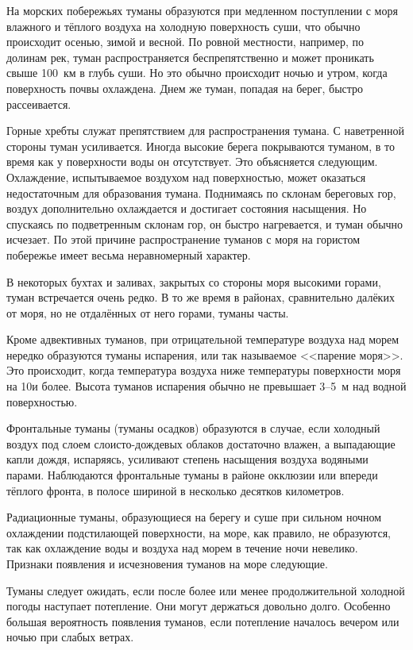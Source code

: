 На морских побережьях туманы образуются при медленном поступлении с
моря влажного и тёплого воздуха на холодную поверхность суши, что
обычно происходит осенью, зимой и весной. По ровной местности,
например, по долинам рек, туман распространяется беспрепятственно и
может проникать свыше 100~км в глубь суши. Но это обычно происходит
ночью и утром, когда поверхность почвы охлаждена. Днем же туман,
попадая на берег, быстро рассеивается.

Горные хребты служат препятствием для распространения тумана. С
наветренной стороны туман усиливается. Иногда высокие берега
покрываются туманом, в то время как у поверхности воды он
отсутствует. Это объясняется следующим. Охлаждение, испытываемое
воздухом над поверхностью, может оказаться недостаточным для
образования тумана. Поднимаясь по склонам береговых гор, воздух
дополнительно охлаждается и достигает состояния насыщения. Но
спускаясь по подветренным склонам гор, он быстро нагревается, и туман
обычно исчезает. По этой причине распространение туманов с моря на
гористом побережье имеет весьма неравномерный характер.

В некоторых бухтах и заливах, закрытых со стороны моря высокими
горами, туман встречается очень редко. В то же время в районах,
сравнительно далёких от моря, но не отдалённых от него горами, туманы
часты.

Кроме адвективных туманов, при отрицательной температуре воздуха над
морем нередко образуются туманы испарения, или так называемое <<парение
моря>>. Это происходит, когда температура воздуха ниже температуры
поверхности моря на 10\grC и более. Высота туманов испарения обычно не
превышает 3--5~м над водной поверхностью.

Фронтальные туманы (туманы осадков) образуются в случае, если холодный
воздух под слоем слоисто-дождевых облаков достаточно влажен, а
выпадающие капли дождя, испаряясь, усиливают степень насыщения воздуха
водяными парами. Наблюдаются фронтальные туманы в районе окклюзии или
впереди тёплого фронта, в полосе шириной в несколько десятков
километров.

Радиационные туманы, образующиеся на берегу и суше при сильном ночном
охлаждении подстилающей поверхности, на море, как правило, не
образуются, так как охлаждение воды и воздуха над морем в течение ночи
невелико. Признаки появления и исчезновения туманов на море следующие.

 Туманы следует ожидать, если после более или менее
продолжительной холодной погоды наступает потепление. Они могут
держаться довольно долго. Особенно большая вероятность появления
туманов, если потепление началось вечером или ночью при слабых ветрах.

